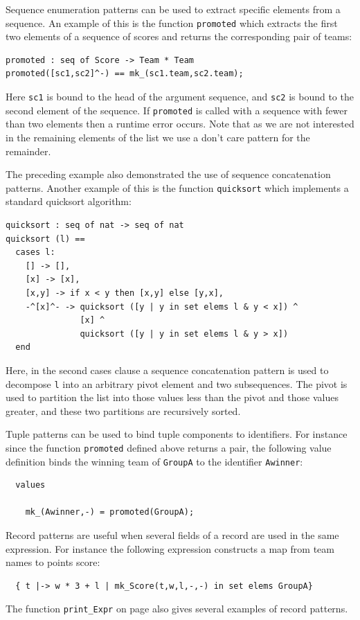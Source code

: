 \documentclass{overturerepchap}
\begin{document}
\begin{description}
Sequence enumeration patterns can be used to extract specific elements
from a sequence. An example of this is the function \texttt{promoted}
which extracts the first two elements of a sequence of scores and
returns the corresponding pair of teams:
\begin{lstlisting}
promoted : seq of Score -> Team * Team
promoted([sc1,sc2]^-) == mk_(sc1.team,sc2.team);
\end{lstlisting}
Here \texttt{sc1} is bound to the head of the argument sequence, and
\texttt{sc2} is bound to the second element of the sequence. If
\texttt{promoted} is called with a sequence with fewer than two
elements then a runtime error occurs. Note that as we are not
interested in the remaining elements of the list we use a don't care
pattern for the remainder. 

The preceding example also demonstrated the use of sequence
concatenation patterns. Another example of this is the function
\texttt{quicksort} which implements a standard quicksort algorithm:
\begin{lstlisting}
quicksort : seq of nat -> seq of nat
quicksort (l) ==
  cases l:
    [] -> [],
    [x] -> [x],
    [x,y] -> if x < y then [x,y] else [y,x],
    -^[x]^- -> quicksort ([y | y in set elems l & y < x]) ^ 
               [x] ^
               quicksort ([y | y in set elems l & y > x])
  end
\end{lstlisting}
Here, in the second cases clause a sequence concatenation pattern is
used to decompose \texttt{l} into an arbitrary pivot element and two
subsequences. The pivot is used to partition the list into those
values less than the pivot and those values greater, and these two
partitions are recursively sorted.

Tuple patterns can be used to bind tuple components to
identifiers. For instance since the function \texttt{promoted} defined
above returns a pair, the following value definition binds the winning
team of \texttt{GroupA} to the identifier \texttt{Awinner}:
\begin{lstlisting}
  values

    mk_(Awinner,-) = promoted(GroupA);
\end{lstlisting}

Record patterns are useful when several fields of a record are used in
the same expression. For instance the following expression constructs
a map from team names to points score:
\begin{lstlisting}
  { t |-> w * 3 + l | mk_Score(t,w,l,-,-) in set elems GroupA}
\end{lstlisting}
The function \texttt{print\_Expr} on page \pageref{printExprDef} also gives
several examples of record patterns.
\end{description}
\end{document}
